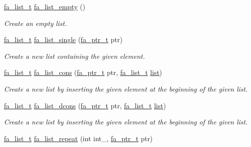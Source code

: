 \begin{DoxyCompactItemize}
\item 
\hyperlink{group___fa_list_ga35ecb12ab934ded0cce0bcf28e3bc5d2}{fa\-\_\-list\-\_\-t} \hyperlink{group___fa_list_gabf678944a2862ba07072920e37cdb23d}{fa\-\_\-list\-\_\-empty} ()
\begin{DoxyCompactList}\small\item\em Create an empty list. \end{DoxyCompactList}\item 
\hyperlink{group___fa_list_ga35ecb12ab934ded0cce0bcf28e3bc5d2}{fa\-\_\-list\-\_\-t} \hyperlink{group___fa_list_ga69d1eb03989a1f8349c292ceed66fd6a}{fa\-\_\-list\-\_\-single} (\hyperlink{group___fa_ga915ddeae99ad7568b273d2b876425197}{fa\-\_\-ptr\-\_\-t} ptr)
\begin{DoxyCompactList}\small\item\em Create a new list containing the given element. \end{DoxyCompactList}\item 
\hyperlink{group___fa_list_ga35ecb12ab934ded0cce0bcf28e3bc5d2}{fa\-\_\-list\-\_\-t} \hyperlink{group___fa_list_ga3cff1dce5051c7e1dd9ef255be911204}{fa\-\_\-list\-\_\-cons} (\hyperlink{group___fa_ga915ddeae99ad7568b273d2b876425197}{fa\-\_\-ptr\-\_\-t} ptr, \hyperlink{group___fa_list_ga35ecb12ab934ded0cce0bcf28e3bc5d2}{fa\-\_\-list\-\_\-t} \hyperlink{literals_8h_a4ddd63dfcfec2b4d5741a56aa6003c76}{list})
\begin{DoxyCompactList}\small\item\em Create a new list by inserting the given element at the beginning of the given list. \end{DoxyCompactList}\item 
\hyperlink{group___fa_list_ga35ecb12ab934ded0cce0bcf28e3bc5d2}{fa\-\_\-list\-\_\-t} \hyperlink{group___fa_list_ga29aba2e79fd9c128c05d020be5a3b254}{fa\-\_\-list\-\_\-dcons} (\hyperlink{group___fa_ga915ddeae99ad7568b273d2b876425197}{fa\-\_\-ptr\-\_\-t} ptr, \hyperlink{group___fa_list_ga35ecb12ab934ded0cce0bcf28e3bc5d2}{fa\-\_\-list\-\_\-t} \hyperlink{literals_8h_a4ddd63dfcfec2b4d5741a56aa6003c76}{list})
\begin{DoxyCompactList}\small\item\em Create a new list by inserting the given element at the beginning of the given list. \end{DoxyCompactList}\item 
\hyperlink{group___fa_list_ga35ecb12ab934ded0cce0bcf28e3bc5d2}{fa\-\_\-list\-\_\-t} \hyperlink{group___fa_list_gacadd05a228af713c5fe13c5baf09ce84}{fa\-\_\-list\-\_\-repeat} (int int\-\_\-, \hyperlink{group___fa_ga915ddeae99ad7568b273d2b876425197}{fa\-\_\-ptr\-\_\-t} ptr)

\end{DoxyCompactItemize}
